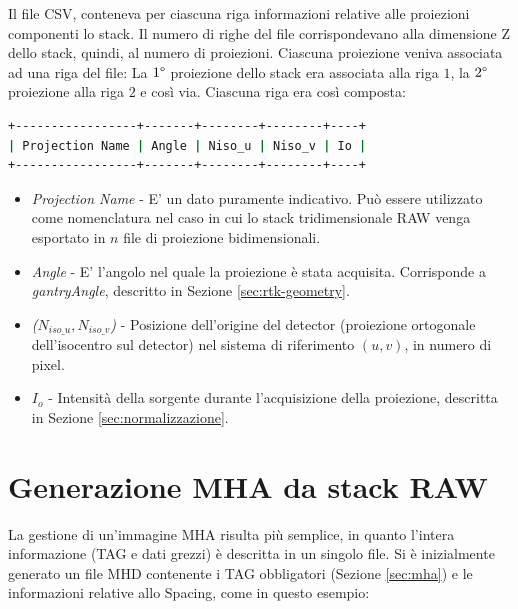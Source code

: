 \documentclass[a4paper,12pt, doubleside]{report}
\begin{document}
            \bigskip    
            \par
                Il file CSV, conteneva per ciascuna riga informazioni relative alle proiezioni componenti lo stack. Il numero di righe del file corrispondevano alla dimensione Z dello stack, quindi, al numero di proiezioni. Ciascuna proiezione veniva associata ad una riga del file: La $1\degree$ proiezione dello stack era associata alla riga $1$, la $2\degree$ proiezione alla riga $2$ e così via. Ciascuna riga era così composta: 
                    
                \begin{lstlisting}[language=bash, frame=bt] 
+-----------------+-------+--------+--------+----+
| Projection Name | Angle | Niso_u | Niso_v | Io |
+-----------------+-------+--------+--------+----+
                \end{lstlisting}
                    
                \begin{itemize}
                    \item \textit{Projection Name} - E' un dato puramente indicativo. Può essere utilizzato come nomenclatura nel caso in cui lo stack tridimensionale RAW venga esportato in $n$ file di proiezione bidimensionali.
                        
                    \item \textit{Angle} - E' l'angolo nel quale la proiezione è stata acquisita. Corrisponde a \textit{gantryAngle}, descritto in Sezione \ref{sec:rtk-geometry}.
                        
                    \item \textit{($N_{iso\_u},N_{iso\_v}$)} - Posizione dell'origine del detector (proiezione ortogonale dell'isocentro sul detector) nel sistema di riferimento $(u,v)$, in numero di pixel.
                        
                    \item \textit{$I_o$} - Intensità della sorgente durante l'acquisizione della proiezione, descritta in Sezione \ref{sec:normalizzazione}.
                \end{itemize}
                
            
        \section{Generazione MHA da stack RAW}
            \label{sec:conversione}
            \par
                La gestione di un'immagine MHA risulta più semplice, in quanto l'intera informazione (TAG e dati grezzi) è descritta in un singolo file. Si è inizialmente generato un file MHD contenente i TAG obbligatori (Sezione \ref{sec:mha}) e le informazioni relative allo Spacing, come in questo esempio:
                    
\end{document}
